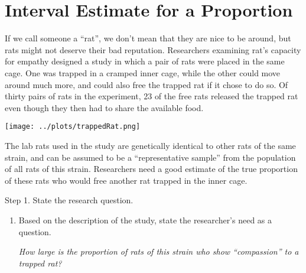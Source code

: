 
\def\theTopic{Interval Estimate }
\def\dayNum{6}

\section{ Interval Estimate for a Proportion}


If we call someone a ``rat'', we don't mean that they are nice to be
around, but rats might not deserve their bad reputation. Researchers
examining rat's capacity for empathy designed a study in which a pair
of rats were placed in the same cage.  One was trapped in a cramped
inner cage, while the other could move around much more, and could
also free the trapped rat if it chose to do so.  Of thirty pairs of
rats in the experiment, 23 of the free rats released the trapped
rat even though they then had to share the available food.


\begin{center}
  \texttt{[image: ../plots/trappedRat.png]}
\end{center}

The lab rats  used in the study are genetically identical to other
rats of the same strain, and can be assumed to be a ``representative
sample'' from the population of all rats of this strain.  Researchers
need a good estimate of the true proportion of these rats who would
free another rat trapped in the inner cage.

{\sf Step 1. State the research question.}\vspace{-.1in}
\begin{enumerate}
  \item Based on the description of the study, state the researcher's
   need as a question. 
\begin{students}
  \vspace{1cm}
\end{students}

\begin{key}
{\it How large is the proportion of rats of this strain who show
  ``compassion'' to a trapped rat?}
\end{key}

\end{enumerate}


